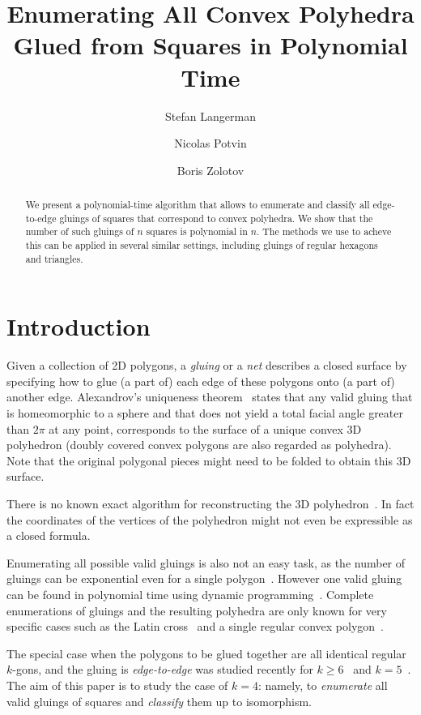 \documentclass[a4paper,USenglish,cleveref, autoref, thm-restate]{socg-lipics-v2019}
\title{Enumerating All Convex Polyhedra Glued from Squares in Polynomial Time}
\author{Stefan Langerman}{Faculté des Sciences, Université Libre de Bruxelles}{stefan.langerman@ulb.ac.be}{ }{Whatever grant}
\author{Nicolas Potvin}{Faculté des Sciences, Université Libre de Bruxelles}{potvinnicolas2@gmail.com}{ }{Whatever grant}
\author{Boris Zolotov}{Department of Mathematics and Computer Sciences, St. Petersburg State University}{boris.a.zolotov@yandex.com}{ }{Whatever grant}
\begin{document}
\maketitle

\begin{abstract}We present a polynomial-time algorithm that allows to enumerate and classify all edge-to-edge gluings of squares that correspond to convex polyhedra. We show that the number of such gluings of $n$ squares is polynomial in $n$. The methods we use to acheve this can be applied in several similar settings, including gluings of regular hexagons and triangles.\end{abstract}

\section{Introduction}

Given a collection of 2D polygons, a \emph{gluing} or a \emph{net} describes a closed surface by specifying how to glue (a part of) each edge of these polygons onto (a part of) another edge. Alexandrov's uniqueness theorem~\cite{alex} states that any valid gluing that is homeomorphic to a sphere and that does not yield a total facial angle greater than $2\pi$ at any point, corresponds to the surface of a unique convex 3D polyhedron (doubly covered convex polygons are also regarded as polyhedra). Note that the original polygonal pieces might need to be folded to obtain this 3D surface.

There is no known exact algorithm for reconstructing the 3D polyhedron~\cite{kpd09-approx,bannister2014galois}. In fact the coordinates of the vertices of the polyhedron might not even be expressible as a closed formula.

Enumerating all possible valid gluings is also not an easy task, as the number of gluings can be exponential even for a single polygon~\cite{DDLO02}. However one valid gluing can be found in polynomial time using dynamic programming~\cite{DO07,lo96-dynprog}. Complete enumerations of gluings and the resulting polyhedra are only known for very specific cases such as the Latin cross~\cite{ddlop99} and a single regular convex polygon~\cite{DO07}.

The special case when the polygons to be glued together are all identical regular $k$-gons, and the gluing is \emph{edge-to-edge} was studied recently for $k \ge 6$~\cite{kl17-hex} and $k=5$~\cite{alz-penta}. The aim of this paper is to study the case of $k=4$: namely, to {\it enumerate} all valid gluings of squares and {\it classify} them up to isomorphism.
\end{document}

